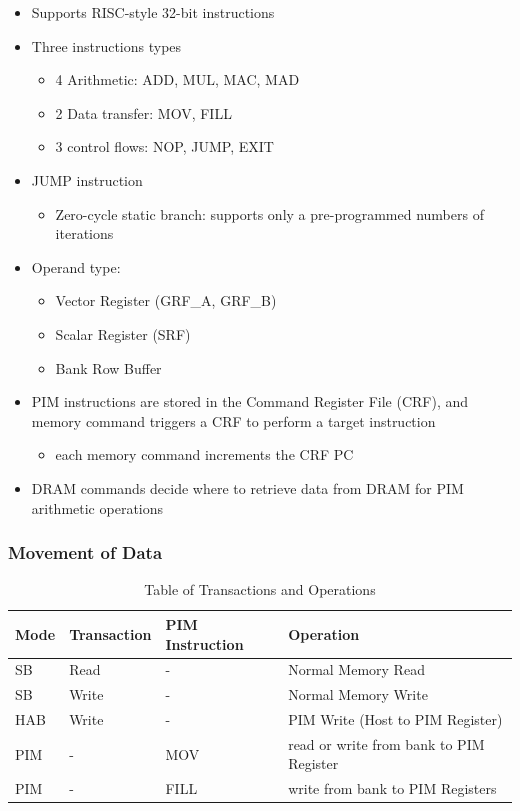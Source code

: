 \documentclass[12pt]{article}
\begin{document}
\begin{itemize}
	\item Supports RISC-style 32-bit instructions
	\item Three instructions types
	\begin{itemize}
		\item 4 Arithmetic: ADD, MUL, MAC, MAD
		\item 2 Data transfer: MOV, FILL
		\item 3 control flows: NOP, JUMP, EXIT
	\end{itemize}
	\item JUMP instruction
	\begin{itemize}
		\item Zero-cycle static branch: supports only a pre-programmed numbers of iterations
	\end{itemize}
	\item Operand type:
	\begin{itemize}
		\item Vector Register (GRF\_A, GRF\_B)
		\item Scalar Register (SRF)
		\item Bank Row Buffer
	\end{itemize}
	\item PIM instructions are stored in the Command Register File (CRF), and memory command triggers a CRF to perform a target instruction
	\begin{itemize}
		\item each memory command increments the CRF PC
	\end{itemize}
	\item DRAM commands decide where to retrieve data from DRAM for PIM arithmetic operations
\end{itemize}









\subsubsection{Movement of Data}
\begin{table}[h!]
	\centering
	\begin{tabular}{|>{\centering\arraybackslash}m{1.5cm}|>{\centering\arraybackslash}m{2.5cm}|>{\centering\arraybackslash}m{3cm}|>{\centering\arraybackslash}m{6cm}|}
		\hline
		\textbf{Mode} & \textbf{Transaction} & \textbf{PIM Instruction} & \textbf{Operation} \\ 
		\hline
		SB & Read & - & Normal Memory Read \\ 
		\hline
		SB & Write & - & Normal Memory Write \\ 
		\hline
		HAB & Write & - & PIM Write (Host to PIM Register) \\ 
		\hline
		PIM & - & MOV & read or write from bank to PIM Register \\ 
		\hline
		PIM & - & FILL & write from bank to PIM Registers \\ 
		\hline
	\end{tabular}
	\caption{Table of Transactions and Operations}
	\label{tab:transactions}
\end{table}
\end{document}
